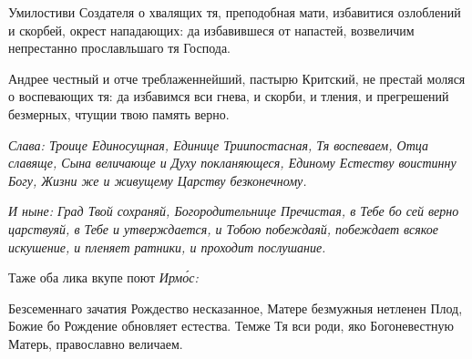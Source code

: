 Умилостиви Создателя о хвалящих тя, преподобная мати, избавитися озлоблений и скорбей, окрест нападающих: да избавившеся от напастей, возвеличим непрестанно прославльшаго тя Господа.


Андрее честный и отче треблаженнейший, пастырю Критский, не престай моляся о воспевающих тя: да избавимся вси гнева, и скорби, и тления, и прегрешений безмерных, чтущии твою память верно.

\itshape Слава\normalfont{}: Троице Единосущная, Единице Триипостасная, Тя воспеваем, Отца славяще, Сына величающе и Духу покланяющеся, Единому Естеству воистинну Богу, Жизни же и живущему Царству безконечному.

\itshape И ныне\normalfont{}: Град Твой сохраняй, Богородительнице Пречистая, в Тебе бо сей верно царствуяй, в Тебе и утверждается, и Тобою побеждаяй, побеждает всякое искушение, и пленяет ратники, и проходит послушание.

Таже оба лика вкупе поют \itshape Ирм\'{о}с\normalfont{}:

Безсеменнаго зачатия Рождество несказанное, Матере безмужныя нетленен Плод, Божие бо Рождение обновляет естества. Темже Тя вси роди, яко Богоневестную Матерь, православно величаем.\mychapterending
